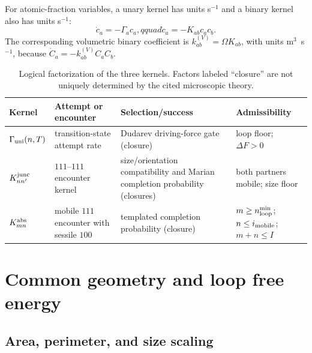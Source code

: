 \documentclass[11pt,a4paper]{article}
\begin{document}
For atomic-fraction variables, a unary kernel has units s$^{-1}$ and a binary
kernel also has units s$^{-1}$:
\begin{equation}
  \dot c_a=-\Gamma_a c_a,qquad
  \dot c_a=-K_{ab}c_ac_b.                                             \label{eq:units}
\end{equation}
The corresponding volumetric binary coefficient is
$k_{ab}^{(V)}=\Omega K_{ab}$, with units m$^3$~s$^{-1}$, because
$\dot C_a=-k_{ab}^{(V)}C_aC_b$.

\begin{table}[ht]
\centering\small
\caption{Logical factorization of the three kernels.  Factors labeled
``closure'' are not uniquely determined by the cited microscopic theory.}
\label{tab:factorization}
\begin{tabular}{p{2.5cm}p{4.3cm}p{4.3cm}p{3.7cm}}
\toprule
Kernel & Attempt or encounter & Selection/success & Admissibility \\
\midrule
$\Gamma_{\rm uni}(n,T)$ & transition-state attempt rate & Dudarev driving-force gate (closure) & loop floor; $\Delta F>0$ \\
$K_{nn'}^{\rm junc}$ & $111$--$111$ encounter kernel & size/orientation compatibility and Marian completion probability (closures) & both partners mobile; size floor \\
$K_{mn}^{\rm abs}$ & mobile $111$ encounter with sessile $100$ & templated completion probability (closure) & $m\ge n_{\rm loop}^{\min}$; $n\le i_{\rm mobile}$; $m+n\le I$ \\
\bottomrule
\end{tabular}
\end{table}

\section{Common geometry and loop free energy}
\label{sec:geometry}

\subsection{Area, perimeter, and size scaling}
\end{document}
